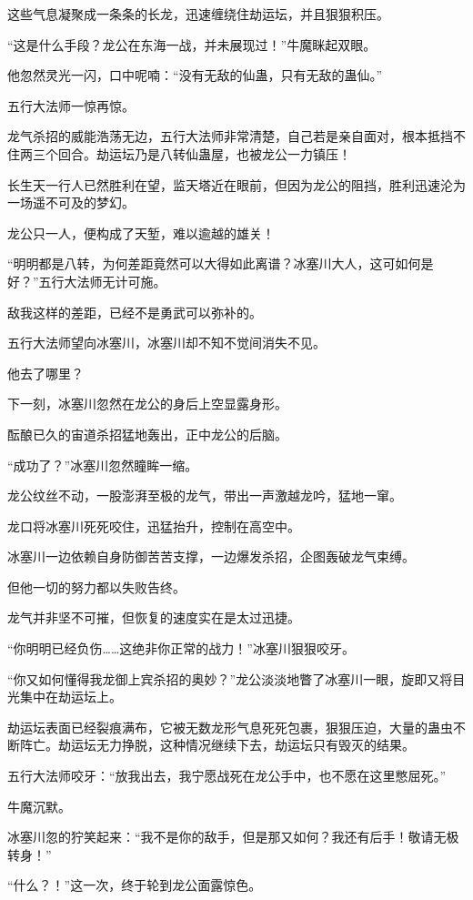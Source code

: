 \begin{this_body}
这些气息凝聚成一条条的长龙，迅速缠绕住劫运坛，并且狠狠积压。

“这是什么手段？龙公在东海一战，并未展现过！”牛魔眯起双眼。

他忽然灵光一闪，口中呢喃：“没有无敌的仙蛊，只有无敌的蛊仙。”

五行大法师一惊再惊。

龙气杀招的威能浩荡无边，五行大法师非常清楚，自己若是亲自面对，根本抵挡不住两三个回合。劫运坛乃是八转仙蛊屋，也被龙公一力镇压！

长生天一行人已然胜利在望，监天塔近在眼前，但因为龙公的阻挡，胜利迅速沦为一场遥不可及的梦幻。

龙公只一人，便构成了天堑，难以逾越的雄关！

“明明都是八转，为何差距竟然可以大得如此离谱？冰塞川大人，这可如何是好？”五行大法师无计可施。

敌我这样的差距，已经不是勇武可以弥补的。

五行大法师望向冰塞川，冰塞川却不知不觉间消失不见。

他去了哪里？

下一刻，冰塞川忽然在龙公的身后上空显露身形。

酝酿已久的宙道杀招猛地轰出，正中龙公的后脑。

“成功了？”冰塞川忽然瞳眸一缩。

龙公纹丝不动，一股澎湃至极的龙气，带出一声激越龙吟，猛地一窜。

龙口将冰塞川死死咬住，迅猛抬升，控制在高空中。

冰塞川一边依赖自身防御苦苦支撑，一边爆发杀招，企图轰破龙气束缚。

但他一切的努力都以失败告终。

龙气并非坚不可摧，但恢复的速度实在是太过迅捷。

“你明明已经负伤……这绝非你正常的战力！”冰塞川狠狠咬牙。

“你又如何懂得我龙御上宾杀招的奥妙？”龙公淡淡地瞥了冰塞川一眼，旋即又将目光集中在劫运坛上。

劫运坛表面已经裂痕满布，它被无数龙形气息死死包裹，狠狠压迫，大量的蛊虫不断阵亡。劫运坛无力挣脱，这种情况继续下去，劫运坛只有毁灭的结果。

五行大法师咬牙：“放我出去，我宁愿战死在龙公手中，也不愿在这里憋屈死。”

牛魔沉默。

冰塞川忽的狞笑起来：“我不是你的敌手，但是那又如何？我还有后手！敬请无极转身！”

“什么？！”这一次，终于轮到龙公面露惊色。

\end{this_body}

